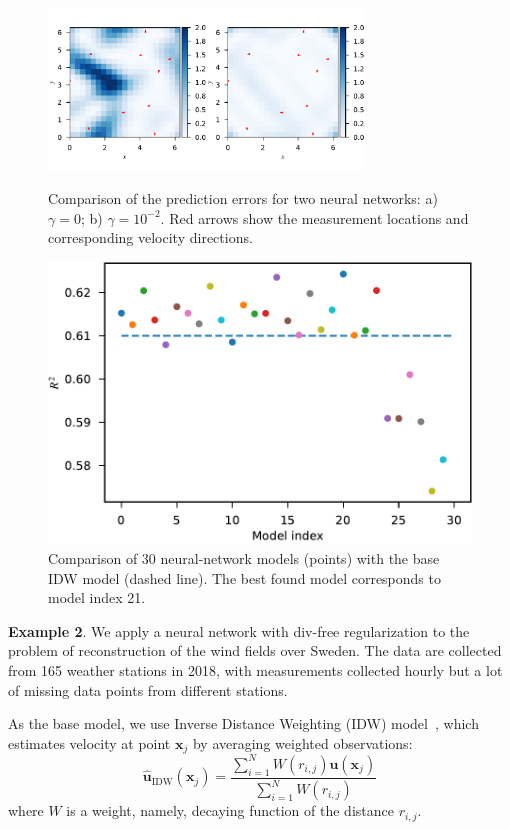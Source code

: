 \documentclass[pamm,a4paper,fleqn]{w-art}
\renewcommand{\vec}[1]{\boldsymbol{#1}}
\begin{document}
\begin{figure}
\begin{minipage}{0.48\textwidth}
  \includegraphics[width=3.3in]{assets/error-fields-comparison.pdf}
  \caption{Comparison of the prediction errors for two neural networks:
    a) $\gamma=0$; b) $\gamma=10^{-2}$.
    Red arrows show the measurement locations and corresponding
  velocity directions.}%
  \label{fig:tg2d}
\end{minipage}
\hfill
\begin{minipage}{0.48\textwidth}
  \centering
  \includegraphics[scale=0.42]{assets/r2-vs-model.pdf}
  \caption{Comparison of 30 neural-network models (points)
    with the base IDW model (dashed line).
  The best found model corresponds to model index 21.}%
  \label{fig:r2-vs-model}
\end{minipage}
\end{figure}

\textbf{Example 2}.
We apply a neural network with div-free regularization to the problem of
reconstruction of the wind fields over Sweden.
The data are collected from 165 weather stations in 2018, with measurements
collected hourly but a lot of missing data points from different stations.

As the base model, we use Inverse Distance Weighting (IDW)
model~\cite{Cellura2008}, which
estimates velocity at point $\vec x_j$ by averaging weighted observations:
\begin{equation}
  \label{eq:base-model}
  \hat{\vec u}_{\text{IDW}}(\vec x_j) =
  \frac{\sum_{i=1}^N W(r_{i,j}) \vec u(\vec x_j)}{\sum_{i=1}^N W(r_{i,j})}
\end{equation}
where $W$ is a weight, namely, decaying function of the distance $r_{i, j}$.
\end{document}
